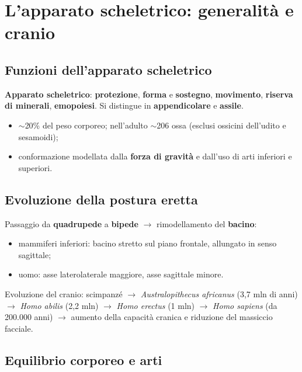 \chapter{L'apparato scheletrico: generalità e cranio}

\section{Funzioni dell'apparato scheletrico}

\textbf{Apparato scheletrico}: \textbf{protezione}, \textbf{forma} e \textbf{sostegno},
\textbf{movimento}, \textbf{riserva di minerali}, \textbf{emopoiesi}. Si distingue in
\textbf{appendicolare} e \textbf{assile}.
\begin{itemize}
  \item $\sim$20\% del peso corporeo; nell'adulto $\sim$206 ossa (esclusi ossicini dell'udito e
    sesamoidi);
  \item conformazione modellata dalla \textbf{forza di gravità} e dall'uso di arti inferiori e
    superiori.
\end{itemize}

\section{Evoluzione della postura eretta}

Passaggio da \textbf{quadrupede} a \textbf{bipede} $\rightarrow$ rimodellamento del \textbf{bacino}:
\begin{itemize}
  \item mammiferi inferiori: bacino stretto sul piano frontale, allungato in senso sagittale;
  \item uomo: asse laterolaterale maggiore, asse sagittale minore.
\end{itemize}
Evoluzione del cranio: scimpanzé $\rightarrow$ \textit{Australopithecus africanus} (3,7 mln di anni)
$\rightarrow$ \textit{Homo abilis} (2,2 mln) $\rightarrow$ \textit{Homo erectus} (1 mln) $\rightarrow$
\textit{Homo sapiens} (da 200.000 anni) $\rightarrow$ aumento della capacità cranica e riduzione del
massiccio facciale.

\section{Equilibrio corporeo e arti}


